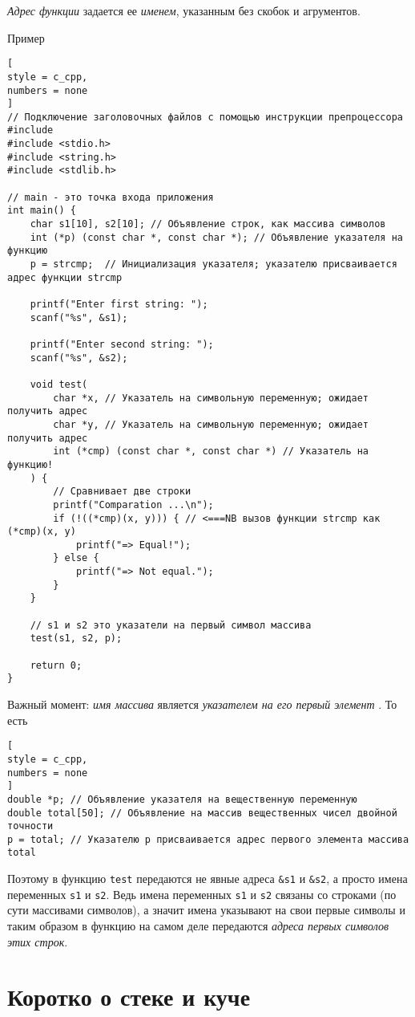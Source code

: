 \documentclass[%
	11pt,
	a4paper,
	utf8,
		]{article}
\begin{document}
\emph{Адрес функции} задается ее \emph{именем}, указанным без скобок и агрументов.

Пример
\begin{lstlisting}[
style = c_cpp,
numbers = none
]
// Подключение заголовочных файлов с помощью инструкции препроцессора #include
#include <stdio.h>
#include <string.h>
#include <stdlib.h>

// main - это точка входа приложения
int main() {
	char s1[10], s2[10]; // Объявление строк, как массива символов
	int (*p) (const char *, const char *); // Объявление указателя на функцию
	p = strcmp;  // Инициализация указателя; указателю присваивается адрес функции strcmp
	
	printf("Enter first string: ");
	scanf("%s", &s1);
	
	printf("Enter second string: ");
	scanf("%s", &s2);
	
	void test(
		char *x, // Указатель на символьную переменную; ожидает получить адрес
		char *y, // Указатель на символьную переменную; ожидает получить адрес
		int (*cmp) (const char *, const char *) // Указатель на функцию!
	) {
		// Сравнивает две строки
		printf("Comparation ...\n");
		if (!((*cmp)(x, y))) { // <===NB вызов функции strcmp как (*cmp)(x, y)
			printf("=> Equal!");
		} else {
			printf("=> Not equal.");
		}
	}
	
	// s1 и s2 это указатели на первый символ массива
	test(s1, s2, p);
	
	return 0;
}
\end{lstlisting}

Важный момент: \emph{имя массива} является \emph{указателем на его первый элемент} \cite[]{koltzov-c-lang:2019}. То есть
\begin{lstlisting}[
style = c_cpp,
numbers = none
]
double *p; // Объявление указателя на вещественную переменную
double total[50]; // Объявление на массив вещественных чисел двойной точности
p = total; // Указателю p присваивается адрес первого элемента массива total
\end{lstlisting}

Поэтому в функцию \texttt{test} передаются не явные адреса \texttt{\&s1} и \texttt{\&s2}, а просто имена переменных \texttt{s1} и \texttt{s2}. Ведь имена переменных \texttt{s1} и \texttt{s2} связаны со строками (по сути массивами символов), а значит имена указывают на свои первые символы и таким образом в функцию на самом деле передаются \emph{адреса первых символов этих строк}. 

\section{Коротко о стеке и куче}
\end{document}
